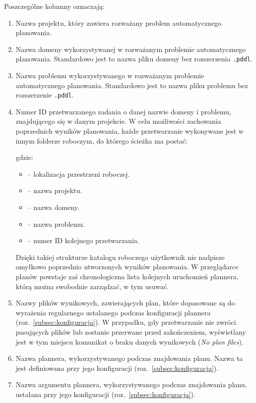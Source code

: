 \noindent
Poszczególne kolumny oznaczają:
\begin{enumerate}
\item Nazwa projektu, który zawiera rozważany problem automatycznego planowania.
\item Nazwa domeny wykorzystywanej w rozważanym problemie automatycznego planowania. Standardowo jest to nazwa pliku domeny bez rozszerzenia \texttt{.pddl}.
\item Nazwa problemu wykorzystywanego w rozważanym problemie automatycznego planowania. Standardowo jest to nazwa pliku problemu bez rozszerzenie \texttt{.pddl}.
\item Numer ID przetwarzanego zadania o danej nazwie domeny i problemu, znajdującego się w danym projekcie. W celu możliwości zachowania poprzednich wyników planowania, każde przetwarzanie wykonywane jest w innym folderze roboczym, do którego ścieżka ma postać:

\noindent
\centerline{}

\noindent
gdzie:

\begin{itemize}
\item \textbf{} -- lokalizacja przestrzeni roboczej.
\item \textbf{} -- nazwa projektu.
\item \textbf{} -- nazwa domeny.
\item \textbf{} -- nazwa problemu.
\item \textbf{} -- numer ID kolejnego przetwarzania.
\end{itemize}
Dzięki takiej strukturze katalogu roboczego użytkownik nie nadpisze omyłkowo poprzednio utworzonych wyników planowania. W przeglądarce planów powstaje zaś chronologiczna lista kolejnych uruchomień plannera, którą można swobodnie zarządzać, w tym usuwać.
\item Nazwy plików wynikowych, zawierających plan, które dopasowane są do wyrażenia regularnego ustalanego podczas konfiguracji plannera (roz.~\ref{subsec:konfiguracja}). W przypadku, gdy przetwarzanie nie zwróci pasujących plików lub zostanie przerwane przed zakończeniem, wyświetlany jest w tym miejscu komunikat o braku danych wynikowych (\textit{No plan files}).
\item Nazwa plannera, wykorzystywanego podczas znajdowania planu. Nazwa ta jest definiowana przy jego konfiguracji (roz.~\ref{subsec:konfiguracja}).
\item Nazwa argumentu plannera, wykorzystywanego podczas znajdowania planu, ustalana przy jego konfiguracji (roz.~\ref{subsec:konfiguracja}).
\end{enumerate}

